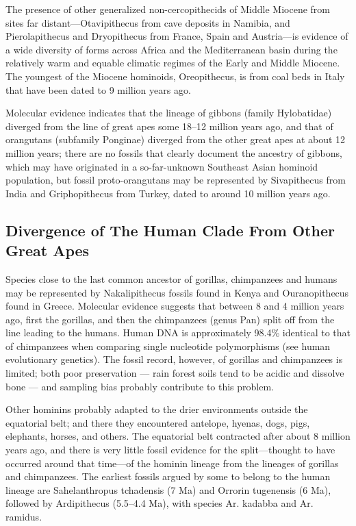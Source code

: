 The presence of other generalized non-cercopithecids of Middle Miocene from sites far distant---Otavipithecus from cave deposits in Namibia, and Pierolapithecus and Dryopithecus from France, Spain and Austria---is evidence of a wide diversity of forms across Africa and the Mediterranean basin during the relatively warm and equable climatic regimes of the Early and Middle Miocene. The youngest of the Miocene hominoids, Oreopithecus, is from coal beds in Italy that have been dated to 9 million years ago.

Molecular evidence indicates that the lineage of gibbons (family Hylobatidae) diverged from the line of great apes some 18--12 million years ago, and that of orangutans (subfamily Ponginae) diverged from the other great apes at about 12 million years; there are no fossils that clearly document the ancestry of gibbons, which may have originated in a so-far-unknown Southeast Asian hominoid population, but fossil proto-orangutans may be represented by Sivapithecus from India and Griphopithecus from Turkey, dated to around 10 million years ago.

\hypertarget{divergence-of-the-human-clade-from-other-great-apes}{%
\subsection{Divergence of The Human Clade From Other Great Apes}\label{divergence-of-the-human-clade-from-other-great-apes}}

Species close to the last common ancestor of gorillas, chimpanzees and humans may be represented by Nakalipithecus fossils found in Kenya and Ouranopithecus found in Greece. Molecular evidence suggests that between 8 and 4 million years ago, first the gorillas, and then the chimpanzees (genus Pan) split off from the line leading to the humans. Human DNA is approximately 98.4\% identical to that of chimpanzees when comparing single nucleotide polymorphisms (see human evolutionary genetics). The fossil record, however, of gorillas and chimpanzees is limited; both poor preservation --- rain forest soils tend to be acidic and dissolve bone --- and sampling bias probably contribute to this problem.

Other hominins probably adapted to the drier environments outside the equatorial belt; and there they encountered antelope, hyenas, dogs, pigs, elephants, horses, and others. The equatorial belt contracted after about 8 million years ago, and there is very little fossil evidence for the split---thought to have occurred around that time---of the hominin lineage from the lineages of gorillas and chimpanzees. The earliest fossils argued by some to belong to the human lineage are Sahelanthropus tchadensis (7 Ma) and Orrorin tugenensis (6 Ma), followed by Ardipithecus (5.5--4.4 Ma), with species Ar. kadabba and Ar. ramidus.

